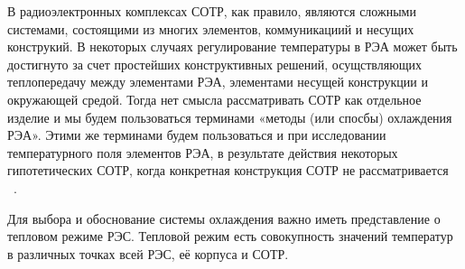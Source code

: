 В радиоэлектронных комплексах СОТР, как правило, являются сложными
системами, состоящими из многих элементов, коммуникациий и несущих
конструкий. В некоторых случаях регулирование температуры в РЭА может
быть достигнуто за счет простейших конструктивных решений,
осущствляющих теплопередачу между элементами РЭА, элементами несущей
конструкции и окружающей средой. Тогда нет смысла рассматривать СОТР
как отдельное изделие и мы будем пользоваться терминами «методы (или
спосбы) охлаждения РЭА». Этими же терминами будем пользоваться и при
исследовании температурного поля элементов РЭА, в результате действия
некоторых гипотетических СОТР, когда конкретная конструкция СОТР не
рассматривается ~\cite{Rotkop1976}.

Для выбора и обоснование системы охлаждения важно иметь представление
о тепловом режиме РЭС.
Тепловой режим есть совокупность значений температур в различных
точках всей РЭС, её корпуса и СОТР.

